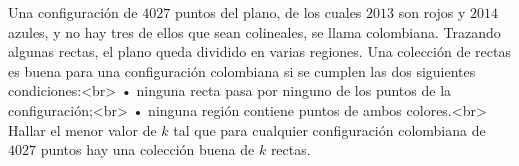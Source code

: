 Una configuración de $4027$ puntos del plano, de los cuales $2013$ son rojos y $2014$ azules, y no hay tres de ellos que sean colineales, se llama colombiana. Trazando algunas rectas, el plano queda dividido en varias regiones. Una colección de rectas es buena para una configuración colombiana si se cumplen las dos siguientes condiciones:<br>
 • ninguna recta pasa por ninguno de los puntos de la configuración;<br>
 • ninguna región contiene puntos de ambos colores.<br>
Hallar el menor valor de $k$ tal que para cualquier configuración colombiana de $4027$ puntos hay una colección buena de $k$ rectas.